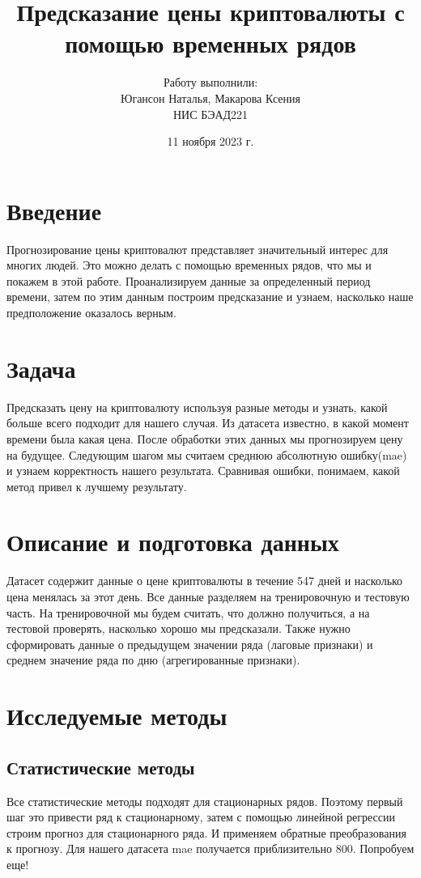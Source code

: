 \documentclass[12pt,a4paper]{article}
\title{Предсказание цены криптовалюты с помощью временных рядов}
\author{Работу выполнили:\\Югансон Наталья, Макарова Ксения\\ НИС БЭАД221}
\date{11 ноября 2023 г.}
\begin{document}
\maketitle


\newpage
\tableofcontents

\newpage

\section{Введение}
Прогнозирование цены криптовалют представляет значительный интерес для многих людей. Это можно делать с помощью временных рядов, что мы и покажем в этой работе. Проанализируем данные за определенный период времени, затем по этим данным построим предсказание и узнаем, насколько наше предположение оказалось верным.

\section{Задача}
 Предсказать цену на криптовалюту используя разные методы и узнать, какой больше всего подходит для нашего случая. Из датасета известно, в какой момент времени была какая цена. После обработки этих данных мы прогнозируем цену на будущее. Следующим шагом мы считаем среднюю абсолютную ошибку(mae) и узнаем корректность нашего результата. Сравнивая ошибки, понимаем, какой метод привел к лучшему результату.
 
\section{Описание и подготовка данных}
Датасет содержит данные о цене криптовалюты в течение 547 дней и насколько цена менялась за этот день. Все данные разделяем на тренировочную и тестовую часть. На тренировочной мы будем считать, что должно получиться, а на тестовой проверять, насколько хорошо мы предсказали. Также нужно сформировать данные о предыдущем значении ряда (лаговые признаки) и среднем значение ряда по дню (агрегированные признаки).

\section{Исследуемые методы}
\subsection{Статистические методы}
Все статистические методы подходят для стационарных рядов. Поэтому первый шаг это  привести ряд к стационарному, затем с помощью линейной регрессии строим прогноз для стационарного ряда. И применяем обратные преобразования к прогнозу. Для нашего датасета mae получается приблизительно 800. Попробуем еще!
\end{document}
